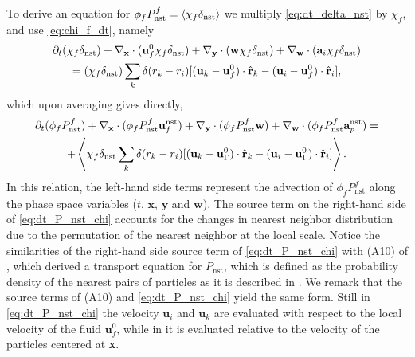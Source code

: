 To derive an equation for $\phi_f P_\text{nst}^f = \left<\chi_f \delta_\text{nst}\right>$ we multiply \ref{eq:dt_delta_nst} by $\chi_f$, and use \ref{eq:chi_f_dt}, namely
\begin{multline}
    \pddt (\chi_f\delta_\text{nst})
    +  \pddx \cdot (\textbf{u}_f^0 \chi_f\delta_\text{nst})
    +  \pddy \cdot (\textbf{w}    \chi_f\delta_\text{nst})
    +  \pddw \cdot   (\textbf{a}_i  \chi_f\delta_\text{nst})\\
    = 
    (\chi_f\delta_\text{nst})
    \sum_k 
    \delta(r_k - r_i)
    [(\textbf{u}_k - \textbf{u}_f^0) \cdot \hat{\textbf{r}}_k - (\textbf{u}_i  - \textbf{u}_f^0)\cdot \hat{\textbf{r}}_i],
    \label{eq:dt_delta_nst_chi}
\end{multline}
which upon averaging gives directly,
\begin{multline}
    \pddt (\phi_fP_\text{nst}^f)
    + 
    \pddx \cdot (
        \phi_f 
        P_\text{nst}^f
        \textbf{u}_f^\text{nst}
    )
    + \pddy \cdot (
        \phi_f
        P_\text{nst}^f
        \textbf{w} 
    )
    +
    \pddw \cdot (  
        \phi_f 
        P_\text{nst}^f
        \textbf{a}_p^\text{nst} 
    )
    = \\
    + \avg{
     \chi_f \delta_\text{nst}
    \sum_k 
    \delta(r_k - r_i)
    [(\textbf{u}_k - \textbf{u}_\Gamma^0) \cdot \hat{\textbf{r}}_k - (\textbf{u}_i- \textbf{u}_\Gamma^0)  \cdot \hat{\textbf{r}}_i]}.
    \label{eq:dt_P_nst_chi}
\end{multline}
In this relation, the left-hand side terms represent the advection of $\phi_f P_\text{nst}^f$ along the phase space variables ($t$, $\textbf{x}$, $\textbf{y}$ and $\textbf{w}$).
The source term on the right-hand side of \ref{eq:dt_P_nst_chi} accounts for the changes in nearest neighbor distribution due to the permutation of the nearest neighbor at the local scale. 
Notice the similarities of the right-hand side source term of \ref{eq:dt_P_nst_chi} with (A10) of \citet{zhang2023evolution}, which derived a transport equation for $P_\text{nst}$, which is defined as the probability density of the nearest pairs of particles as it is described in \citet{fintzi2024buoyancy}. 
We remark that the source terms of (A10) \citet{zhang2023evolution} and \ref{eq:dt_P_nst_chi} yield the same form.
Still in \ref{eq:dt_P_nst_chi} the velocity $\textbf{u}_i$ and $\textbf{u}_k$ are evaluated with respect to the local velocity of the fluid $\textbf{u}_f^0$, while in \citet{zhang2023evolution} it is evaluated relative to the velocity of the particles centered at \textbf{x}. 


